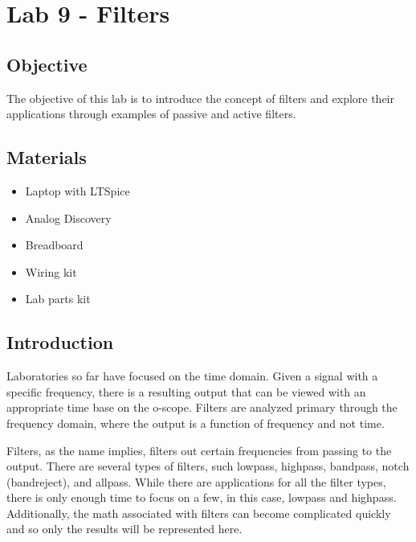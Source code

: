 \chapter{Lab 9 - Filters}

\section{Objective}

The objective of this lab is to introduce the concept of filters and explore their applications through examples of passive and active filters. 

\section{Materials}

\begin{itemize}
	\item Laptop with LTSpice
	\item Analog Discovery
	\item Breadboard
	\item Wiring kit
	\item Lab parts kit
\end{itemize}

\section{Introduction}

Laboratories so far have focused on the time domain. Given a signal with a specific frequency, there is a resulting output that can be viewed with an appropriate time base on the o-scope. Filters are analyzed primary through the frequency domain, where the output is a function of frequency and not time. 

Filters, as the name implies, filters out certain frequencies from passing to the output. There are several types of filters, such lowpass, highpass, bandpass, notch (bandreject), and allpass. While there are applications for all the filter types, there is only enough time to focus on a few, in this case, lowpass and highpass. Additionally, the math associated with filters can become complicated quickly and so only the results will be represented here. 

